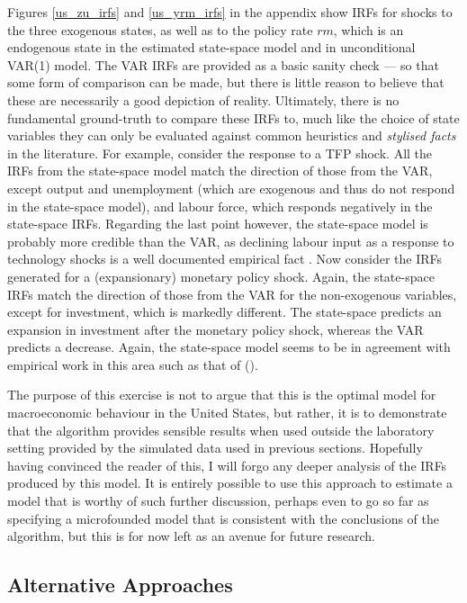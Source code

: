 \documentclass{article}
\begin{document}
Figures \ref{us_zu_irfs} and \ref{us_yrm_irfs} in the appendix show IRFs for shocks to the three exogenous states, as well as to the policy rate $rm$, which is an endogenous state in the estimated state-space model and in unconditional VAR(1) model. The VAR IRFs are provided as a basic sanity check --- so that some form of comparison can be made, but there is little reason to believe that these are necessarily a good depiction of reality. Ultimately, there is no fundamental ground-truth to compare these IRFs to, much like the choice of state variables they can only be evaluated against common heuristics and \textit{stylised facts} in the literature. For example, consider the response to a TFP shock. All the IRFs from the state-space model match the direction of those from the VAR, except output and unemployment (which are exogenous and thus do not respond in the state-space model), and labour force, which responds negatively in the state-space IRFs. Regarding the last point however, the state-space model is probably more credible than the VAR, as declining labour input as a response to technology shocks is a well documented empirical fact \parencite{gali2004technology}. Now consider the IRFs generated for a (expansionary) monetary policy shock. Again, the state-space IRFs match the direction of those from the VAR for the non-exogenous variables, except for investment, which is markedly different. The state-space predicts an expansion in investment after the monetary policy shock, whereas the VAR predicts a decrease. Again, the state-space model seems to be in agreement with empirical work in this area such as that of \citeauthor{christiano2005nominal} (\citeyear{christiano2005nominal}).

The purpose of this exercise is not to argue that this is the optimal model for macroeconomic behaviour in the United States, but rather, it is to demonstrate that the algorithm provides sensible results when used outside the laboratory setting provided by the simulated data used in previous sections. Hopefully having convinced the reader of this, I will forgo any deeper analysis of the IRFs produced by this model. It is entirely possible to use this approach to estimate a model that is worthy of such further discussion, perhaps even to go so far as specifying a microfounded model that is consistent with the conclusions of the algorithm, but this is for now left as an avenue for future research.

\subsection{Alternative Approaches}
\end{document}
